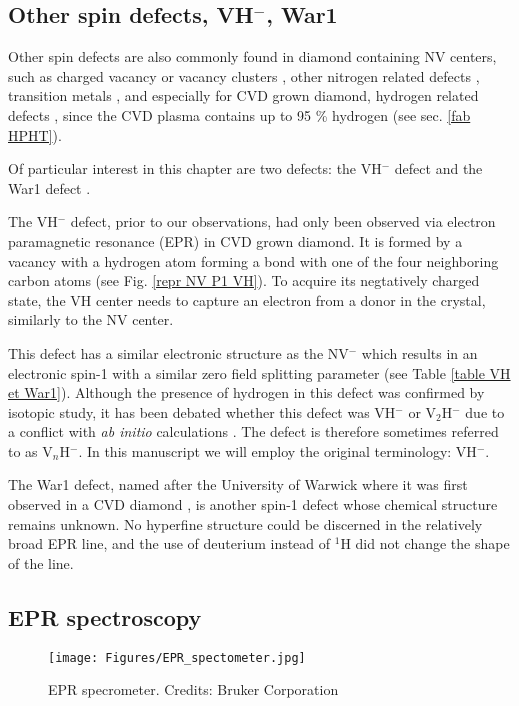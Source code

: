 \documentclass[a4paper,11pt]{report}
\begin{document}
\subsection{Other spin defects, VH$^-$, War1}
\label{other defects}
Other spin defects are also commonly found in diamond containing NV centers, such as charged vacancy or vacancy clusters \citep{hounsome2006origin}, other nitrogen related defects \citep{newton2007epr}, transition metals \citep{isoya1990fourier}, and especially for CVD grown diamond, hydrogen related defects \citep{hartland2014study}, since the CVD plasma contains up to 95 \% hydrogen (see sec. \ref{fab HPHT}).

Of particular interest in this chapter are two defects: the VH$^-$ defect \citep{glover2003hydrogen, glover2004hydrogen} and the War1 defect \citep{cruddace2007magnetic}. 

The VH$^-$ defect, prior to our observations, had only been observed via electron paramagnetic resonance (EPR) in CVD grown diamond. It is formed by a vacancy with a hydrogen atom forming a bond with one of the four neighboring carbon atoms (see Fig. \ref{repr NV P1 VH}). To acquire its negtatively charged state, the VH center needs to capture an electron from a donor in the crystal, similarly to the NV center. 

This defect has a similar electronic structure as the NV$^-$ which results in an electronic spin-1 with a similar zero field splitting parameter (see Table \ref{table VH et War1}). Although the presence of hydrogen in this defect was confirmed by isotopic study, it has been debated whether this defect was VH$^-$ or V$_2$H$^-$ due to a conflict with \textit{ab initio} calculations \citep{shaw2005importance}. The defect is therefore sometimes referred to as V$_n$H$^-$. In this manuscript we will employ the original terminology: VH$^-$.

The War1 defect, named after the University of Warwick where it was first observed in a CVD diamond \citep{cruddace2007magnetic}, is another spin-1 defect whose chemical structure remains unknown. No hyperfine structure could be discerned in the relatively broad EPR line, and the use of deuterium instead of $^1$H did not change the shape of the line.

\subsection{EPR spectroscopy}
\begin{figure}[h!]
\centering
\texttt{[image: Figures/EPR\_spectometer.jpg]}
\caption{EPR specrometer. Credits: Bruker Corporation} 
\label{photo EPR}
\end{figure}
\end{document}
